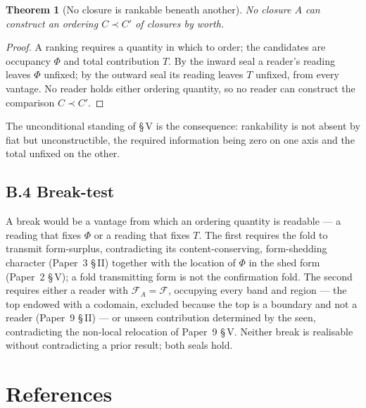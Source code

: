 \documentclass[11pt,oneside]{report}
\newtheorem{theorem}{Theorem}[section]
\theoremstyle{definition}
\theoremstyle{remark}
\begin{document}
\begin{theorem}[No closure is rankable beneath another]
No closure \ensuremath{A} can construct an ordering \ensuremath{C \prec C'} of closures by worth.
\end{theorem}

\begin{proof}
A ranking requires a quantity in which to order; the candidates are occupancy \ensuremath{\Phi} and total contribution \ensuremath{T}. By the inward seal a reader's reading leaves \ensuremath{\Phi} unfixed; by the outward seal its reading leaves \ensuremath{T} unfixed, from every vantage. No reader holds either ordering quantity, so no reader can construct the comparison \ensuremath{C \prec C'}.
\end{proof}

\noindent The unconditional standing of \S\,V is the consequence: rankability is not absent by fiat but unconstructible, the required information being zero on one axis and the total unfixed on the other.

\subsection*{B.4 Break-test}

A break would be a vantage from which an ordering quantity is readable --- a reading that fixes \ensuremath{\Phi} or a reading that fixes \ensuremath{T}. The first requires the fold to transmit form-surplus, contradicting its content-conserving, form-shedding character (Paper~3 \S\,II) together with the location of \ensuremath{\Phi} in the shed form (Paper~2 \S\,V); a fold transmitting form is not the confirmation fold. The second requires either a reader with \ensuremath{\mathcal{F}_A = \mathcal{F}}, occupying every band and region --- the top endowed with a codomain, excluded because the top is a boundary and not a reader (Paper~9 \S\,II) --- or unseen contribution determined by the seen, contradicting the non-local relocation of Paper~9 \S\,V. Neither break is realisable without contradicting a prior result; both seals hold.

\section*{References}
\end{document}
